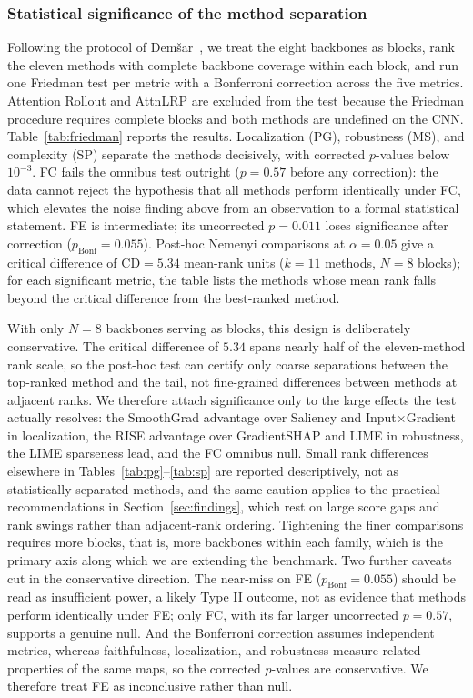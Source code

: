 \documentclass[final,5p,times,twocolumn]{elsarticle}
\begin{document}
\subsubsection{Statistical significance of the method separation}
\label{sec:stats}
Following the protocol of Dem\v{s}ar~\cite{demsar2006statistical}, we treat the eight backbones as blocks, rank the eleven methods with complete backbone coverage within each block, and run one Friedman test per metric with a Bonferroni correction across the five metrics. Attention Rollout and AttnLRP are excluded from the test because the Friedman procedure requires complete blocks and both methods are undefined on the CNN. Table~\ref{tab:friedman} reports the results. Localization (PG), robustness (MS), and complexity (SP) separate the methods decisively, with corrected $p$-values below $10^{-3}$. FC fails the omnibus test outright ($p = 0.57$ before any correction): the data cannot reject the hypothesis that all methods perform identically under FC, which elevates the noise finding above from an observation to a formal statistical statement. FE is intermediate; its uncorrected $p = 0.011$ loses significance after correction ($p_{\text{Bonf}} = 0.055$). Post-hoc Nemenyi comparisons at $\alpha = 0.05$ give a critical difference of $\mathrm{CD} = 5.34$ mean-rank units ($k = 11$ methods, $N = 8$ blocks); for each significant metric, the table lists the methods whose mean rank falls beyond the critical difference from the best-ranked method.

With only $N = 8$ backbones serving as blocks, this design is deliberately conservative. The critical difference of $5.34$ spans nearly half of the eleven-method rank scale, so the post-hoc test can certify only coarse separations between the top-ranked method and the tail, not fine-grained differences between methods at adjacent ranks. We therefore attach significance only to the large effects the test actually resolves: the SmoothGrad advantage over Saliency and Input$\times$Gradient in localization, the RISE advantage over GradientSHAP and LIME in robustness, the LIME sparseness lead, and the FC omnibus null. Small rank differences elsewhere in Tables~\ref{tab:pg}--\ref{tab:sp} are reported descriptively, not as statistically separated methods, and the same caution applies to the practical recommendations in Section~\ref{sec:findings}, which rest on large score gaps and rank swings rather than adjacent-rank ordering. Tightening the finer comparisons requires more blocks, that is, more backbones within each family, which is the primary axis along which we are extending the benchmark. Two further caveats cut in the conservative direction. The near-miss on FE ($p_{\mathrm{Bonf}} = 0.055$) should be read as insufficient power, a likely Type II outcome, not as evidence that methods perform identically under FE; only FC, with its far larger uncorrected $p = 0.57$, supports a genuine null. And the Bonferroni correction assumes independent metrics, whereas faithfulness, localization, and robustness measure related properties of the same maps, so the corrected $p$-values are conservative. We therefore treat FE as inconclusive rather than null.
\end{document}
